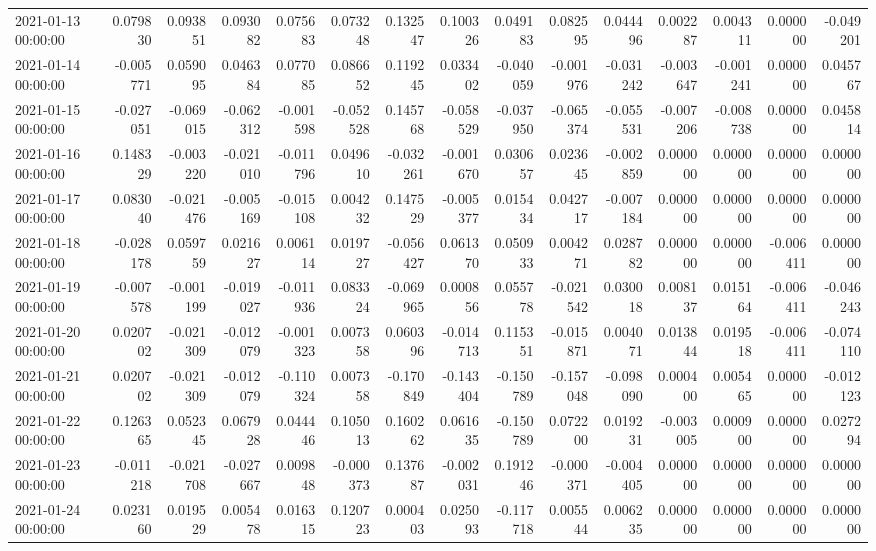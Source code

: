 \begin{tabular}{lrrrrrrrrrrrrrr}
2021-01-13 00:00:00 & 0.079830 & 0.093851 & 0.093082 & 0.075683 & 0.073248 & 0.132547 & 0.100326 & 0.049183 & 0.082595 & 0.044496 & 0.002287 & 0.004311 & 0.000000 & -0.049201 \\
2021-01-14 00:00:00 & -0.005771 & 0.059095 & 0.046384 & 0.077085 & 0.086652 & 0.119245 & 0.033402 & -0.040059 & -0.001976 & -0.031242 & -0.003647 & -0.001241 & 0.000000 & 0.045767 \\
2021-01-15 00:00:00 & -0.027051 & -0.069015 & -0.062312 & -0.001598 & -0.052528 & 0.145768 & -0.058529 & -0.037950 & -0.065374 & -0.055531 & -0.007206 & -0.008738 & 0.000000 & 0.045814 \\
2021-01-16 00:00:00 & 0.148329 & -0.003220 & -0.021010 & -0.011796 & 0.049610 & -0.032261 & -0.001670 & 0.030657 & 0.023645 & -0.002859 & 0.000000 & 0.000000 & 0.000000 & 0.000000 \\
2021-01-17 00:00:00 & 0.083040 & -0.021476 & -0.005169 & -0.015108 & 0.004232 & 0.147529 & -0.005377 & 0.015434 & 0.042717 & -0.007184 & 0.000000 & 0.000000 & 0.000000 & 0.000000 \\
2021-01-18 00:00:00 & -0.028178 & 0.059759 & 0.021627 & 0.006114 & 0.019727 & -0.056427 & 0.061370 & 0.050933 & 0.004271 & 0.028782 & 0.000000 & 0.000000 & -0.006411 & 0.000000 \\
2021-01-19 00:00:00 & -0.007578 & -0.001199 & -0.019027 & -0.011936 & 0.083324 & -0.069965 & 0.000856 & 0.055778 & -0.021542 & 0.030018 & 0.008137 & 0.015164 & -0.006411 & -0.046243 \\
2021-01-20 00:00:00 & 0.020702 & -0.021309 & -0.012079 & -0.001323 & 0.007358 & 0.060396 & -0.014713 & 0.115351 & -0.015871 & 0.004071 & 0.013844 & 0.019518 & -0.006411 & -0.074110 \\
2021-01-21 00:00:00 & 0.020702 & -0.021309 & -0.012079 & -0.110324 & 0.007358 & -0.170849 & -0.143404 & -0.150789 & -0.157048 & -0.098090 & 0.000400 & 0.005465 & 0.000000 & -0.012123 \\
2021-01-22 00:00:00 & 0.126365 & 0.052345 & 0.067928 & 0.044446 & 0.105013 & 0.160262 & 0.061635 & -0.150789 & 0.072200 & 0.019231 & -0.003005 & 0.000900 & 0.000000 & 0.027294 \\
2021-01-23 00:00:00 & -0.011218 & -0.021708 & -0.027667 & 0.009848 & -0.000373 & 0.137687 & -0.002031 & 0.191246 & -0.000371 & -0.004405 & 0.000000 & 0.000000 & 0.000000 & 0.000000 \\
2021-01-24 00:00:00 & 0.023160 & 0.019529 & 0.005478 & 0.016315 & 0.120723 & 0.000403 & 0.025093 & -0.117718 & 0.005544 & 0.006235 & 0.000000 & 0.000000 & 0.000000 & 0.000000 \\

\end{tabular}
